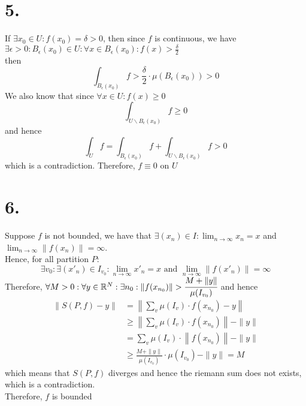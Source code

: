 \documentclass[11pt]{article}
\begin{document}
\section*{5.}
If $\exists x_0 \in U: f(x_0) = \delta > 0$, then since $f$ is continuous, we have 
$\exists \epsilon > 0: B_\epsilon(x_0) \in U: \forall x \in B_\epsilon(x_0): f(x) > \frac{\delta}{2}$ \\
then 
\[
    \int_{B_\epsilon(x_0)} f > \frac{\delta}{2} \cdot \mu(B_\epsilon(x_0)) > 0
\]
We also know that since $\forall x \in U: f(x) \ge 0$
\[\int_{U\backslash B_\epsilon(x_0)} f\ge 0\]
and hence
\[
    \int_U f = \int_{B_\epsilon(x_0)} f + \int_{U\backslash B_\epsilon(x_0)} f > 0    
\]
which is a contradiction. Therefore, $f\equiv 0$ on $U$
\pagebreak
\section*{6.}
Suppose $f$ is not bounded, we have that  
$\exists (x_n) \in I: \lim_{n \to \infty} x_n = x$ and $\lim_{n \to \infty}\|f(x_n)\| = \infty$. \\
Hence, for all partition $P$:
\[\exists v_0: \exists (x'_n) \in I_{v_0}: \lim_{n \to \infty} x'_n = x 
\text{ and } \lim_{n \to \infty}\|f(x'_n)\| = \infty\]
Therefore, $\forall M >0: \forall y \in \mathbb{R}^N: \exists n_0: \|f(x_{n_0}) \| > \cfrac{M + \|y\|}{\mu(I_{v_0})}$
and hence
\begin{equation*}
    \begin{align}
        \|S(P,f)-y\| &= \left\| \sum_v \mu(I_v) \cdot f(x_{n_0}) - y \right\| \\
        &\ge \left\|\sum_v \mu(I_v) \cdot f(x_{n_0}) \right\| - \|y\| \\
        &= \sum_v \mu(I_v) \cdot \left\|f(x_{n_0}) \right\| - \|y\| \\
        &\ge \frac{M+\|y\|}{\mu(I_{v_0})} \cdot \mu(I_{v_0}) - \|y\|= M    
    \end{align}
\end{equation*}
which means that $S(P,f)$ diverges and hence the riemann sum does not exists, which is a contradiction. \\
Therefore, $f$ is bounded
\end{document}
